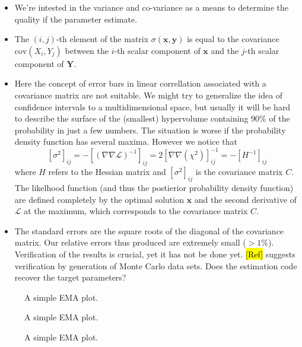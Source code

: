 \documentclass[10pt,a4paper]{article}
\begin{document}
\begin{itemize}
\item We're intested in the variance and co-variance as a means to determine the quality if the parameter estimate.
\item The $\left( i, j \right)$-th element of the matrix $\sigma (\mathbf{x}, \mathbf{y})$ is equal to the covariance $\mbox{cov}(X_i, Y_j)$ between the $i$-th scalar component of $\mathbf{x}$ and the $j$-th scalar component of $\mathbf{Y}$. 
\item Here the concept of error bars in linear correllation associated with a covariance matrix are not suitable. We might try to generalize the idea of confidence intervals to a multidimensional space, but usually it will be hard to describe the surface of the (smallest) hypervolume containing 90\% of the probability in just a few numbers. The situation is worse if the probability density function has several maxima. However we notice that 
\[ \left[\sigma^2 \right]_{ij} = -\left[ \left( \nabla \nabla \mathcal{L}\right)^{-1}\right]_{ij} = 2 \left[ \nabla \nabla \left( \chi^2\right)\right]_{ij}^{-1} = -\left[H^{-1} \right]_{ij}\]
where $H$ refers to the Hessian matrix and $\left[\sigma^2 \right]_{ij}$ is the covariance matrix $C$. The likelhood function (and thus the postierior probability density function) are defined completely by the optimal solution $\mathbf{x}$ and the second derivative of $\mathcal{L}$ at the maximum, which corresponds to the covariance matrix $C$.
\item The standard errors are the square roots of the diagonal of the covariance matrix. Our relative errors thus produced are extremely small ($> 1 \%$). Verification of the results is crucial, yet it has not be done yet. \hl{[Ref]} suggests verification by generation of Monte Carlo data sets. Does the estimation code recover the target parameters?
\end{itemize}

\begin{figure}[htb]
    \centering
    \resizebox{14cm}{!}{}
    \caption{A simple EMA plot.\label{fig:trajectories}}
\end{figure}

\begin{figure}[htb]
    \centering
    \resizebox{14cm}{!}{}
    \caption{A simple EMA plot.\label{fig:inverse_problem}}
\end{figure}

\begin{figure}[htb]
    \centering
    \resizebox{14cm}{!}{}
    \caption{A simple EMA plot.\label{fig:convergence}}
\end{figure}
\end{document}
